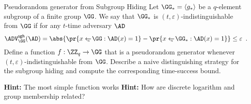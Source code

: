 \documentclass{crypto-exercise}
\author{Sven Laur}
\newcommand{\ADVSH}[2]{\ADV_{#1}^{\mathsf{sgh}}(#2)}
\begin{document}
\begin{exercise}{Pseudorandom generator from Subgroup Hiding}
 Let $\GG_*=\langle g_*\rangle$ be a $q$-element subgroup of a finite group $\GG$. 
 We say that $\GG_*$ is $(t,\varepsilon)$-indistinguishable from $\GG$ if for any $t$-time
 adversary $\AD$
  \begin{align*}
  \ADVSH{\GG}{\AD}=\abs{\pr{x\getsu\GG:\AD(x)=1}-\pr{x\getsu\GG_*:\AD(x)=1}}
  \leq\varepsilon\enspace.
  \end{align*}
 Define a function $f:\ZZ_q\to\GG$ that is a pseudorandom generator whenever 
 $(t,\varepsilon)$-indistinguishable from $\GG$. Describe a naive distinguishing strategy 
 for the subgroup hiding and compute the corresponding time-success bound. 
\end{exercise}
\begin{solution}
\textbf{Hint:} The most simple function works 
\textbf{Hint:} How are discrete logarithm and group membership related? 
	
\end{solution}
\end{document}

